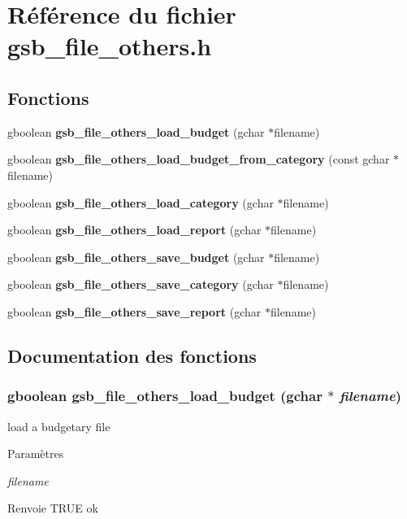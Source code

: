 \section{Référence du fichier gsb\_\-file\_\-others.h}
\label{gsb__file__others_8h}
\subsection*{Fonctions}
\begin{DoxyCompactItemize}
\item 
gboolean {\bf gsb\_\-file\_\-others\_\-load\_\-budget} (gchar $\ast$filename)
\item 
gboolean {\bf gsb\_\-file\_\-others\_\-load\_\-budget\_\-from\_\-category} (const gchar $\ast$filename)
\item 
gboolean {\bf gsb\_\-file\_\-others\_\-load\_\-category} (gchar $\ast$filename)
\item 
gboolean {\bf gsb\_\-file\_\-others\_\-load\_\-report} (gchar $\ast$filename)
\item 
gboolean {\bf gsb\_\-file\_\-others\_\-save\_\-budget} (gchar $\ast$filename)
\item 
gboolean {\bf gsb\_\-file\_\-others\_\-save\_\-category} (gchar $\ast$filename)
\item 
gboolean {\bf gsb\_\-file\_\-others\_\-save\_\-report} (gchar $\ast$filename)
\end{DoxyCompactItemize}


\subsection{Documentation des fonctions}
\subsubsection[{gsb\_\-file\_\-others\_\-load\_\-budget}]{\setlength{\rightskip}{0pt plus 5cm}gboolean gsb\_\-file\_\-others\_\-load\_\-budget (gchar $\ast$ {\em filename})}\label{gsb__file__others_8h_ab94262275e2508a95eff55c1f2fa9274}
load a budgetary file


\begin{DoxyParams}{Paramètres}
\item[{\em filename}]\end{DoxyParams}
\begin{DoxyReturn}{Renvoie}
TRUE ok 
\end{DoxyReturn}


